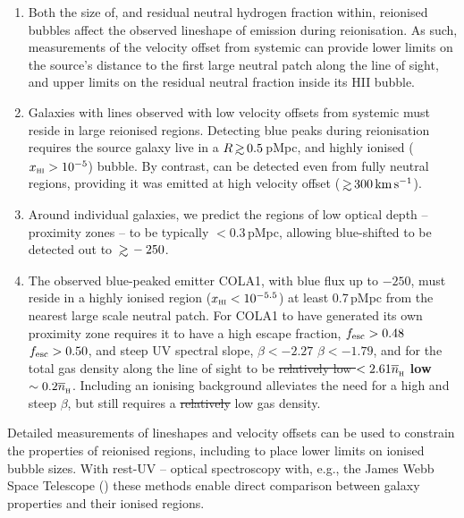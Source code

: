 \documentclass[fleqn,usenatbib]{mnras}
\providecommand{\DIFadd}[1]{{\protect\color{Green} \bf #1}} %
\providecommand{\DIFdel}[1]{{\protect\color{lightgray} \footnotesize \sout{#1}}} %
\providecommand{\DIFaddbegin}{} %
\providecommand{\DIFaddend}{} %
\providecommand{\DIFdelbegin}{} %
\providecommand{\DIFdelend}{} %
\newcommand{\DIFscaledelfig}{0.5}
\newlength{\DIFdelgraphicswidth} %
\newlength{\DIFdelgraphicsheight} %
\newcommand{\DIFaddincludegraphics}[2][]{{\color{blue}\fbox{\DIFOincludegraphics[#1]{#2}}}} %
\newcommand{\DIFdelincludegraphics}[2][]{%
\sbox{\DIFdelgraphicsbox}{\DIFOincludegraphics[#1]{#2}}%
\settoboxwidth{\DIFdelgraphicswidth}{\DIFdelgraphicsbox} %
\settoboxtotalheight{\DIFdelgraphicsheight}{\DIFdelgraphicsbox} %
\scalebox{\DIFscaledelfig}{%
\parbox[b]{\DIFdelgraphicswidth}{\usebox{\DIFdelgraphicsbox}\\[-\baselineskip] \rule{\DIFdelgraphicswidth}{0em}}\llap{\resizebox{\DIFdelgraphicswidth}{\DIFdelgraphicsheight}{%
\setlength{\unitlength}{\DIFdelgraphicswidth}%
\begin{picture}(1,1)%
\thicklines\linethickness{2pt} %
{\color[rgb]{1,0,0}\put(0,0){\framebox(1,1){}}}%
{\color[rgb]{1,0,0}\put(0,0){\line( 1,1){1}}}%
{\color[rgb]{1,0,0}\put(0,1){\line(1,-1){1}}}%
\end{picture}%
}\hspace*{3pt}}} %
} %
\DeclareRobustCommand{\DIFaddbegin}{\DIFOaddbegin \let\includegraphics\DIFaddincludegraphics} %
\DeclareRobustCommand{\DIFaddend}{\DIFOaddend \let\includegraphics\DIFOincludegraphics} %
\DeclareRobustCommand{\DIFdelbegin}{\DIFOdelbegin \let\includegraphics\DIFdelincludegraphics} %
\DeclareRobustCommand{\DIFdelend}{\DIFOaddend \let\includegraphics\DIFOincludegraphics} %
\begin{document}
\begin{enumerate}
    \item Both the size of, and residual neutral hydrogen fraction within, reionised bubbles affect the observed lineshape of \lya emission during reionisation. As such, measurements of the \lya velocity offset from systemic can provide lower limits on the source's distance to the first large neutral patch along the line of sight, and upper limits on the residual neutral fraction inside its HII bubble.
    \item Galaxies with \lya lines observed with low velocity offsets from systemic must reside in large reionised regions. Detecting blue \lya peaks during reionisation requires the source galaxy live in a $R\simgt 0.5$\,pMpc, and highly ionised ($\xHI > 10^{-5}$) bubble. By contrast, \lya can be detected even from fully neutral regions, providing it was emitted at high velocity offset ($\simgt 300\kms$).
    \item Around individual galaxies, we predict the regions of low \lya optical depth -- proximity zones -- to be typically $<0.3$\,pMpc, allowing blue-shifted \lya to be detected out to $\simgt -250$\kms.
    \item The observed blue-peaked \lya emitter COLA1, with blue flux up to $-250$\kms, must reside in a highly ionised region ($\xHI < 10^{-5.5}$) at least 0.7\,pMpc from the nearest large scale neutral patch. For COLA1 to have generated its own proximity zone requires it to have a high escape fraction, \DIFdelbegin \DIFdel{$\fesc > 0.48$}\DIFdelend \DIFaddbegin \DIFadd{$\fesc > 0.50$}\DIFaddend , and steep UV spectral slope, \DIFdelbegin \DIFdel{$\beta < -2.27$}\DIFdelend \DIFaddbegin \DIFadd{$\beta < -1.79$}\DIFaddend , and for the total gas density along the line of sight to be \DIFdelbegin \DIFdel{relatively low $<2.61\nh$}\DIFdelend \DIFaddbegin \DIFadd{low $\sim0.2\nh$}\DIFaddend . Including an ionising background alleviates the need for a high \fesc and steep $\beta$, but still requires a \DIFdelbegin \DIFdel{relatively }\DIFdelend low gas density.
\end{enumerate}

Detailed measurements of \lya lineshapes and velocity offsets can be used to constrain the properties of reionised regions, including to place lower limits on ionised bubble sizes. With rest-UV -- optical spectroscopy with, e.g., the James Webb Space Telescope (\JWST) these methods enable direct comparison between galaxy properties and their ionised regions.
\end{document}
